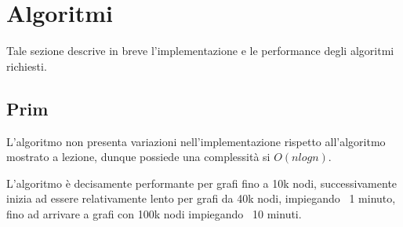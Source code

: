 \section{Algoritmi}
Tale sezione descrive in breve l'implementazione e le performance degli algoritmi richiesti.

\subsection{Prim}
L'algoritmo non presenta variazioni nell'implementazione rispetto all'algoritmo mostrato a lezione, dunque possiede una complessità si $O(nlog n)$.

L'algoritmo è decisamente performante per grafi fino a 10k nodi, successivamente inizia ad essere relativamente lento per grafi da 40k nodi, impiegando ~1 minuto, fino ad arrivare a grafi con 100k nodi impiegando ~10 minuti.

